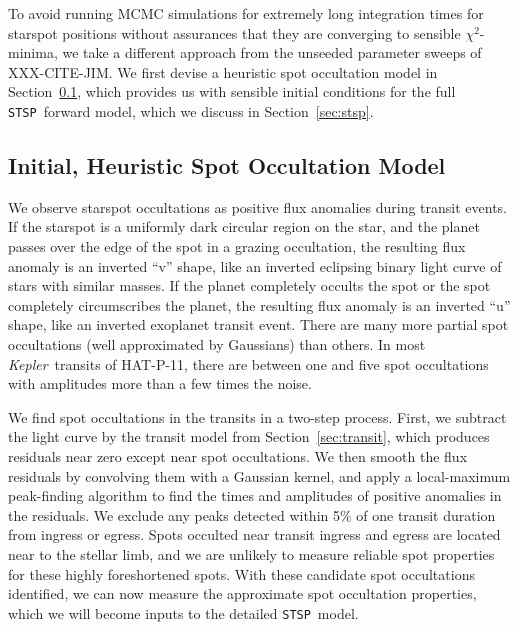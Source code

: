 \documentclass[iop]{emulateapj}
\newcommand{\stsp}{\texttt{STSP}}
\newcommand{\kepler}{\textit{Kepler}}
\begin{document}
To avoid running MCMC simulations for extremely long integration times for starspot positions without assurances that they are converging to sensible $\chi^2$-minima, we take a different approach from the unseeded parameter sweeps of XXX-CITE-JIM. We first devise a heuristic spot occultation model in Section~\ref{sec:friedrich}, which provides us with sensible initial conditions for the full \stsp\ forward model, which we discuss in Section~\ref{sec:stsp}.


\subsection{Initial, Heuristic Spot Occultation Model} \label{sec:friedrich}

We observe starspot occultations as positive flux anomalies during transit events. If the starspot is a uniformly dark circular region on the star, and the planet passes over the edge of the spot in a grazing occultation, the resulting flux anomaly is an inverted ``v'' shape, like an inverted eclipsing binary light curve of stars with similar masses. If the planet completely occults the spot or the spot completely circumscribes the planet, the resulting flux anomaly is an inverted ``u'' shape, like an inverted exoplanet transit event. There are many more partial spot occultations (well approximated by Gaussians) than others. In most \kepler\ transits of HAT-P-11, there are between one and five spot occultations with amplitudes more than a few times the noise.

We find spot occultations in the transits in a two-step process. First, we subtract the light curve by the transit model from Section~\ref{sec:transit}, which produces residuals near zero except near spot occultations. We then smooth the flux residuals by convolving them with a Gaussian kernel, and apply a local-maximum peak-finding algorithm to find the times and amplitudes of positive anomalies in the residuals. We exclude any peaks detected within 5\% of one transit duration from ingress or egress. Spots occulted near transit ingress and egress are located near to the stellar limb, and we are unlikely to measure reliable spot properties for these highly foreshortened spots. With these candidate spot occultations identified, we can now measure the approximate spot occultation properties, which we will become inputs to the detailed \stsp\ model.
\end{document}
